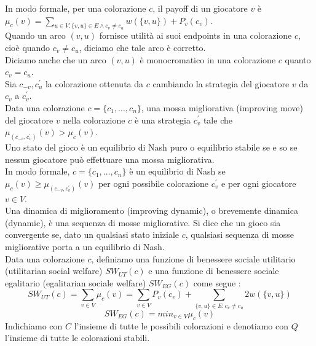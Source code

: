 In modo formale, per una colorazione \(c\), il payoff di un giocatore \(v\) è \(\mu_c (v) = \sum_{u \in V:\{v, u\} \in E \wedge c_v \neq c_u} w(\{v, u\}) + P_v(c_v)\).\\

Quando un arco \((v, u)\) fornisce utilità ai suoi endpoints in una colorazione \(c\), cioè quando \(c_v \neq c_u\), diciamo che tale arco è corretto.\\

Diciamo anche che un arco \((v, u)\) è monocromatico in una colorazione \(c\) quanto \(c_v = c_u\).\\

Sia \(c_{-v}, c_u^{\prime}\) la colorazione ottenuta da \(c\) cambiando la strategia del giocatore \(v\) da \(c_v\) a \(c_v^{\prime}\).\\

Data una colorazione \(c = \{c_1,\ldots,c_n\}\), una mossa migliorativa (improving move) del giocatore \(v\) nella colorazione \(c\) è una strategia \(c_v^{\prime}\) tale che \(\mu_{(c_{-v}, c_v^{\prime})} (v) > \mu_c (v)\).\\

Uno stato del gioco è un equilibrio di Nash puro o equilibrio stabile se e so se nessun giocatore può effettuare una mossa migliorativa.\\

In modo formale, \(c = \{c_1,\ldots,c_n\}\) è un equilibrio di Nash se \(\mu_c (v) \geq \mu_{(c_{-v}, c_v^{\prime})} (v)\) per ogni possibile colorazione \(c_v^{\prime}\) e per ogni giocatore \(v \in V\).\\

Una dinamica di miglioramento (improving dynamic), o brevemente dinamica (dynamic), è una sequenza di mosse migliorative. Si dice che un gioco sia convergente se, dato un qualsiasi stato iniziale \(c\), qualsiasi sequenza di mosse migliorative porta a un equilibrio di Nash.\\

Data una colorazione \(c\), definiamo una funzione di benessere sociale utilitario (utilitarian social welfare) \(SW_{UT}(c)\) e una funzione di benessere sociale egalitario (egalitarian sociale welfare) \(SW_{EG}(c)\) come segue :
\[SW_{UT} (c) = \sum_{v \in V} \mu_c (v) = \sum_{v \in V} P_v(c_v) + \sum_{\{v, u\} \in E : c_v \neq c_u} 2w(\{v, u\})\]
\[SW_{EG} (c) = min_{v \in V} \mu_c (v)\]
Indichiamo con \(C\) l'insieme di tutte le possibili colorazioni e denotiamo con \(Q\) l'insieme di tutte le colorazioni stabili.\\

